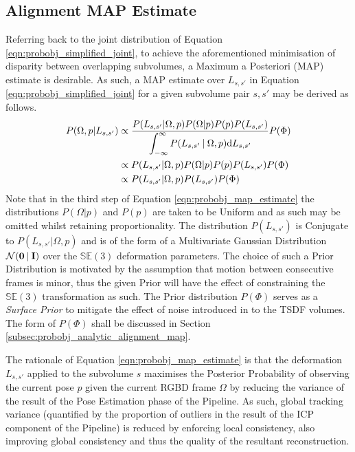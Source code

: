 \subsection{Alignment MAP Estimate}
\label{subsec:probobj_alignment_map}
Referring back to the joint distribution of Equation
\ref{eqn:probobj_simplified_joint}, to achieve the aforementioned minimisation
of disparity between overlapping subvolumes, a Maximum a Posteriori (MAP)
estimate is desirable. As such, a MAP estimate over $L_{s, s'}$ in Equation
\ref{eqn:probobj_simplified_joint} for a given subvolume pair $s, s'$ may be
derived as follows.
\begin{align}
  \label{eqn:probobj_map_estimate}
  P(\Omega, p | L_{s, s'}) & \propto \frac{P(L_{s, s'} | \Omega, p) 
  P(\Omega | p)P(p)P(L_{s, s'})}
  {\displaystyle\int_{-\infty}^{\infty} P(L_{s, s'} \:\vert\: \Omega, p)
  {\mathrm d{L_{s, s'}}}} P(\Phi) \\
  & \propto P(L_{s, s'} | \Omega, p) P(\Omega | p)P(p)P(L_{s, s'})P(\Phi) \\
  & \propto P(L_{s, s'} | \Omega, p)P(L_{s, s'})P(\Phi)
\end{align}
Note that in the third step of Equation \ref{eqn:probobj_map_estimate} the
distributions $P(\Omega | p)$ and $P(p)$ are taken to be Uniform and as such may
be omitted whilst retaining proportionality. The distribution $P(L_{s, s'})$ is
Conjugate to $P(L_{s, s'} | \Omega, p)$ and is of the form of a Multivariate
Gaussian Distribution $\mathcal{N}(\mathbf{0} \:\vert\: \mathbf{I})$ over the
$\mathbb{SE}(3)$ deformation parameters. The choice of such a Prior Distribution
is motivated by the assumption that motion between consecutive frames is minor,
thus the given Prior will have the effect of constraining the $\mathbb{SE}(3)$
transformation as such. The Prior distribution $P(\Phi)$ serves as a
\textit{Surface Prior} to mitigate the effect of noise introduced in to the TSDF
volumes. The form of $P(\Phi)$ shall be discussed in Section
\ref{subsec:probobj_analytic_alignment_map}.

The rationale of Equation \ref{eqn:probobj_map_estimate} is that the deformation
$L_{s, s'}$ applied to the subvolume $s$ maximises the Posterior Probability of
observing the current pose $p$ given the current RGBD frame $\Omega$ by reducing
the variance of the result of the Pose Estimation phase of the Pipeline. As such,
global tracking variance (quantified by the proportion of outliers in the result
of the ICP component of the Pipeline) is reduced by enforcing local consistency,
also improving global consistency and thus the quality of the resultant
reconstruction.

